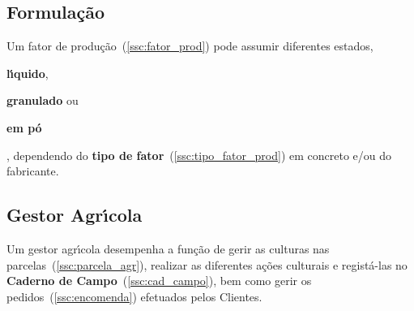 \documentclass[12pt, a4paper]{article}
\begin{document}

\subsection{Formula\c{c}\~ao}\label{ssc:formulacao}

Um fator de produ\c{c}\~ao~(\ref{ssc:fator_prod}) pode assumir diferentes estados,
\begin{enumerate*}[label = (\roman*)]
    \item \textbf{l\'{\i}quido},
    \item \textbf{granulado}
        ou
    \item \textbf{em p\'o}
\end{enumerate*}, dependendo do \textbf{tipo de fator}~(\ref{ssc:tipo_fator_prod})
em concreto e/ou do fabricante.


\subsection{Gestor Agr\'{\i}cola}\label{ssc:gest_agr}

Um gestor agr\'{\i}cola desempenha a função de gerir as culturas nas
parcelas~(\ref{ssc:parcela_agr}), realizar as diferentes ações culturais e regist\'a-las no
\textbf{Caderno de Campo}~(\ref{ssc:cad_campo}), bem como gerir os
pedidos~(\ref{ssc:encomenda}) efetuados pelos Clientes.

\end{document}
